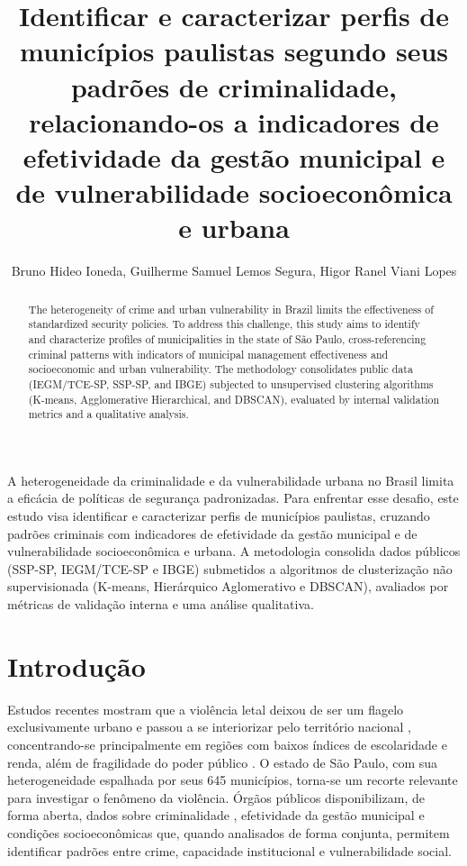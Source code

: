 \documentclass[12pt]{article}
\title{Identificar e caracterizar perfis de municípios paulistas segundo seus padrões de criminalidade, relacionando-os a indicadores de efetividade da gestão municipal e de vulnerabilidade socioeconômica e urbana}
\author{Bruno Hideo Ioneda\inst{1}, Guilherme Samuel Lemos Segura\inst{1}, Higor Ranel Viani Lopes\inst{1}}
\begin{document}
 

\maketitle

\begin{abstract} 
The heterogeneity of crime and urban vulnerability in Brazil limits the effectiveness of standardized security policies. To address this challenge, this study aims to identify and characterize profiles of municipalities in the state of São Paulo, cross-referencing criminal patterns with indicators of municipal management effectiveness and socioeconomic and urban vulnerability. The methodology consolidates public data (IEGM/TCE-SP, SSP-SP, and IBGE) subjected to unsupervised clustering algorithms (K-means, Agglomerative Hierarchical, and DBSCAN), evaluated by internal validation metrics and a qualitative analysis.
\end{abstract}
   
\begin{resumo}
A heterogeneidade da criminalidade e da vulnerabilidade urbana
no Brasil limita a eficácia de políticas de segurança padronizadas. Para enfrentar esse desafio, este estudo visa identificar e caracterizar perfis de municípios paulistas, cruzando padrões criminais com indicadores de efetividade da gestão municipal e de vulnerabilidade socioeconômica e urbana. A metodologia consolida dados públicos (SSP-SP, IEGM/TCE-SP e IBGE) submetidos a algoritmos de clusterização não supervisionada (K-means, Hierárquico Aglomerativo e DBSCAN), avaliados por métricas de validação interna e uma análise qualitativa. 
\end{resumo}

\section{Introdução}
Estudos recentes mostram que a violência letal deixou de ser um flagelo exclusivamente urbano e passou a se interiorizar pelo território nacional \cite{soaresfilho2024}, concentrando-se principalmente em regiões com baixos índices de escolaridade e renda, além de fragilidade do poder público \cite{minamisava2009}.
O estado de São Paulo, com sua heterogeneidade espalhada por seus 645 municípios, torna-se um recorte relevante para investigar o fenômeno da violência. Órgãos públicos disponibilizam, de forma aberta, dados sobre criminalidade \cite{ssp-sp}, efetividade da gestão municipal \cite{tce-sp} e condições socioeconômicas \cite{ibge-sidra} que, quando analisados de forma conjunta, permitem identificar padrões entre crime, capacidade institucional e vulnerabilidade social.
\end{document}
